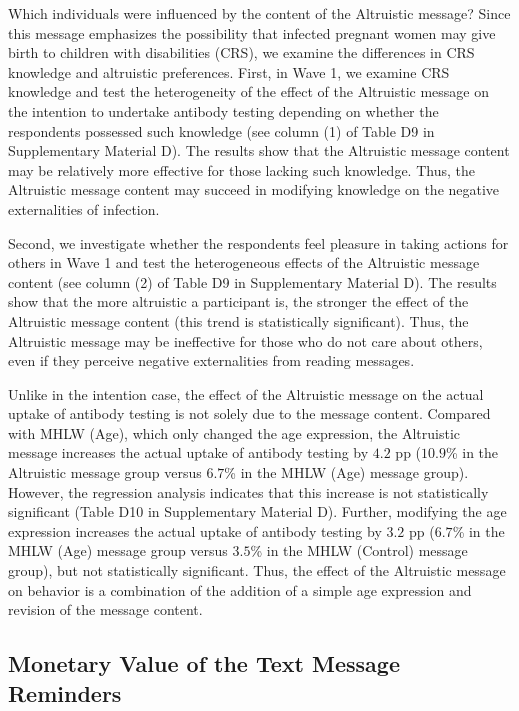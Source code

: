 \documentclass[
  11pt,
  a4paper
]{article}
\begin{document}
Which individuals were influenced by the content of the Altruistic message? Since this message emphasizes the possibility that infected pregnant women may give birth to children with disabilities (CRS), we examine the differences in CRS knowledge and altruistic preferences. First, in Wave 1, we examine CRS knowledge and test the heterogeneity of the effect of the Altruistic message on the intention to undertake antibody testing depending on whether the respondents possessed such knowledge (see column (1) of Table D9 in Supplementary Material D). The results show that the Altruistic message content may be relatively more effective for those lacking such knowledge. Thus, the Altruistic message content may succeed in modifying knowledge on the negative externalities of infection.

Second, we investigate whether the respondents feel pleasure in taking actions for others in Wave 1 and test the heterogeneous effects of the Altruistic message content (see column (2) of Table D9 in Supplementary Material D). The results show that the more altruistic a participant is, the stronger the effect of the Altruistic message content (this trend is statistically significant). Thus, the Altruistic message may be ineffective for those who do not care about others, even if they perceive negative externalities from reading messages.

Unlike in the intention case, the effect of the Altruistic message on the actual uptake of antibody testing is not solely due to the message content. Compared with MHLW (Age), which only changed the age expression, the Altruistic message increases the actual uptake of antibody testing by \(4.2\) pp (\(10.9\)\% in the Altruistic message group versus \(6.7\)\% in the MHLW (Age) message group). However, the regression analysis indicates that this increase is not statistically significant (Table D10 in Supplementary Material D). Further, modifying the age expression increases the actual uptake of antibody testing by \(3.2\) pp (\(6.7\)\% in the MHLW (Age) message group versus \(3.5\)\% in the MHLW (Control) message group), but not statistically significant. Thus, the effect of the Altruistic message on behavior is a combination of the addition of a simple age expression and revision of the message content.

\hypertarget{monetary-value-of-the-text-message-reminders}{%
\subsection{Monetary Value of the Text Message Reminders}\label{monetary-value-of-the-text-message-reminders}}
\end{document}
